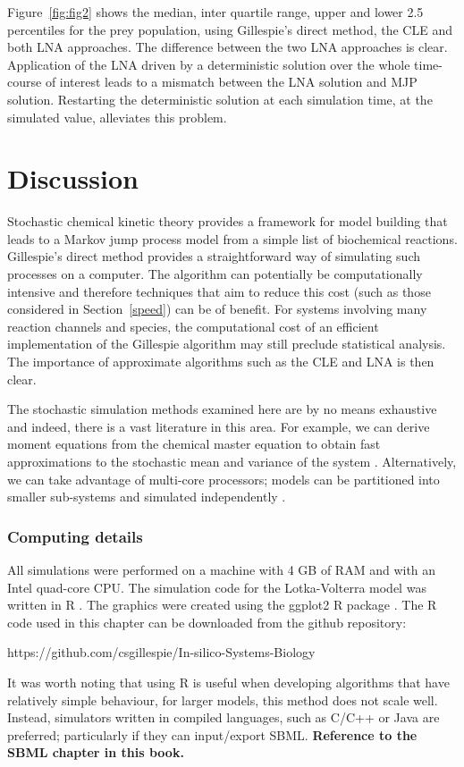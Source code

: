 \documentclass[12pt, DIV12]{scrartcl}
\begin{document}
Figure~\ref{fig:fig2} shows the median, inter quartile range, upper and lower
2.5 percentiles for the prey population, using Gillespie's direct method, the
CLE and both LNA approaches. The difference between the two LNA approaches is
clear. Application of the LNA driven by a deterministic solution over the whole
time-course of interest leads to a mismatch between the LNA solution and MJP
solution. Restarting the deterministic solution at each simulation time, at the
simulated value, alleviates this problem.

\section{Discussion}\label{sec:disc}

Stochastic chemical kinetic theory provides a framework for model building that
leads to a Markov jump process model from a simple list of biochemical
reactions. Gillespie's direct method provides a straightforward way of
simulating such processes on a computer. The algorithm can potentially be
computationally intensive and therefore techniques that aim to reduce this cost
(such as those considered in Section~\ref{speed}) can be of benefit. For systems
involving many reaction channels and species, the computational cost of an
efficient implementation of the Gillespie algorithm may still preclude
statistical analysis. The importance of approximate algorithms such as the CLE
and LNA is then clear.

The stochastic simulation methods examined here are by no means exhaustive and
indeed, there is a vast literature in this area. For example, we can derive
moment equations from the chemical master equation to obtain fast approximations
to the stochastic mean and variance of the system \cite{Gillespie2009a,
  Gomez-Uribe2007,krishnarajah:05}. Alternatively, we can take advantage of
multi-core processors; models can be partitioned into smaller sub-systems and
simulated independently \cite{Gillespie2012}.


\subsubsection*{Computing details} 

All simulations were performed on a machine with 4 GB of RAM and with an Intel
quad-core CPU. The simulation code for the Lotka-Volterra model was written in R
\cite{R}. The graphics were created using the ggplot2 R package \cite{ggplot2}.
The R code used in this chapter can be downloaded from the github repository:
\begin{center}
https://github.com/csgillespie/In-silico-Systems-Biology
\end{center}
It was worth noting that using R is useful when developing algorithms that have
relatively simple behaviour, for larger models, this method does not scale well.
Instead, simulators written in compiled languages, such as C/C++ or Java are
preferred; particularly if they can input/export SBML. \textbf{Reference to the
  SBML chapter in this book.}



\end{document}
